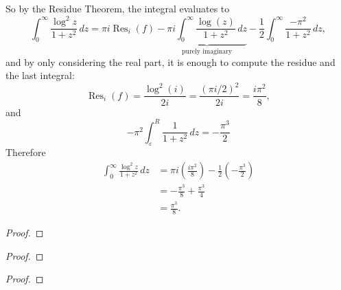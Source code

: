 \documentclass{article}
\newenvironment{problem}[2][Problem]{\begin{trivlist}
\item[\hskip \labelsep {\bfseries #1}\hskip \labelsep {\bfseries #2.}]}{\end{trivlist}}
\begin{document}
So by the Residue Theorem, the integral evaluates to \[
  \int_0^\infty\frac{\log^2 z}{1 + z^2}\,dz
  = \pi i \operatorname{Res}_i(f)
    - \underbrace{\pi i\int_0^\infty\frac{\log(z)}{1 + z^2}\,dz}_\text{purely imaginary}
    - \frac{1}{2}\int_0^\infty\frac{-\pi^2}{1 + z^2}\,dz,
\] and by only considering the real part, it is enough to compute the residue and the last integral: \[
  \operatorname{Res}_i(f)
  = \frac{\log^2(i)}{2i}
  = \frac{(\pi i/2)^2}{2i}
  = \frac{i\pi^2}{8},
\] and \[
  -\pi^2\int_\varepsilon^R\frac{1}{1 + z^2}\,dz = -\frac{\pi^3}{2}
\]
Therefore \begin{align*}
  \int_0^\infty\frac{\log^2 z}{1 + z^2}\,dz
  &= \pi i \left(\frac{i\pi^2}{8}\right)
    - \frac{1}{2}\left(-\frac{\pi^3}{2}\right) \\
  &= -\frac{\pi^3}{8} + \frac{\pi^3}{4} \\
  &= \frac{\pi^3}{8}.
\end{align*}
\pagebreak

\begin{problem}{2}
\end{problem}

\begin{proof}
\end{proof}

\pagebreak

\begin{problem}{3}
\end{problem}

\begin{proof}
\end{proof}

\pagebreak

\begin{problem}{4}
\end{problem}

\begin{proof}
\end{proof}
\end{document}
